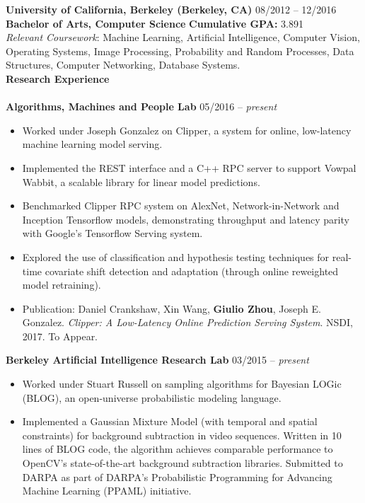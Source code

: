 \documentclass{article}
\begin{document}
\noindent
\textbf{University of California, Berkeley (Berkeley, CA)}
\hfill 08/2012 -- 12/2016 \\
\indent
\textbf{Bachelor of Arts, Computer Science}  
\hfill{\textbf{Cumulative GPA: }3.891}\\
\textit{Relevant Coursework}: Machine Learning, Artificial Intelligence, Computer Vision, Operating Systems, Image Processing, Probability and Random Processes, Data Structures, Computer Networking, Database Systems.
\\

\noindent
\textbf{{\Large Research Experience}}\\[-2mm]
\HRule\\
\noindent
\textbf{Algorithms, Machines and People Lab}
\hfill 05/2016 -- \textit{present}
\begin{itemize}
\vspace{-2.5mm}
\item Worked under Joseph Gonzalez on Clipper, a system for online, low-latency machine learning model serving.
\vspace{-2.5mm}
\item Implemented the REST interface and a C++ RPC server to support Vowpal Wabbit, a scalable library for linear model predictions.
\vspace{-2.5mm}
\item Benchmarked Clipper RPC system on AlexNet, Network-in-Network and Inception Tensorflow models, demonstrating throughput and latency parity with Google's Tensorflow Serving system.
\vspace{-2.5mm}
\item Explored the use of classification and hypothesis testing techniques for real-time covariate shift detection and adaptation (through online reweighted model retraining).
\vspace{-2.5mm}
\item Publication: Daniel Crankshaw, Xin Wang, \textbf{Giulio Zhou}, Joseph E. Gonzalez. \textit{Clipper: A Low-Latency Online Prediction Serving System}. NSDI, 2017. To Appear.
\end{itemize}
\vspace{-2mm}

\noindent
\textbf{Berkeley Artificial Intelligence Research Lab}
\hfill 03/2015 -- \textit{present}
\begin{itemize}
\vspace{-2.5mm}
\item Worked under Stuart Russell on sampling algorithms for Bayesian LOGic (BLOG), an open-universe probabilistic modeling language.
\vspace{-2.5mm}
\item Implemented a Gaussian Mixture Model (with temporal and spatial constraints) for background subtraction in video sequences. Written in 10 lines of BLOG code, the algorithm achieves comparable performance to OpenCV's state-of-the-art background subtraction libraries. Submitted to DARPA as part of DARPA's Probabilistic Programming for Advancing Machine Learning (PPAML) initiative.
\end{itemize}
\vspace{-2mm}
\end{document}
